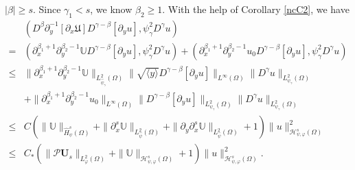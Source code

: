 \documentclass{amsart}
\numberwithin{equation}{section}
\newcommand\y{{{\langle y \rangle}}}
\begin{document}
 $|\beta|\geq s$. Since $\gamma_{1}<s$, we know $\beta_{2}\geq1$. With the help of Corollary \ref{ncC2}, we have
\begin{align*}
&(D^{\beta}\partial_{y}^{-1}[\partial_{x}\mathfrak{U}]D^{\gamma-\beta}[\partial_{y}u],\psi_{\gamma}^{2}D^{\gamma}u)\\
=& (\partial_{x}^{\beta_{1}+1}\partial_{y}^{\beta_{2}-1}\mathbb{U}D^{\gamma-\beta}[\partial_{y}u],\psi_{\gamma}^{2}D^{\gamma}u)
  +(\partial_{x}^{\beta_{1}+1}\partial_{y}^{\beta_{2}-1}u_{0}D^{\gamma-\beta}[\partial_{y}u],\psi_{\gamma}^{2}D^{\gamma}u)\\
\leq& \|\partial_{x}^{\beta_{1}+1}\partial_{y}^{\beta_{2}-1}\mathbb{U}\|_{L_{\hat{\psi}_{\gamma}}^{2}(\Omega)}
      \|\sqrt{\y}D^{\gamma-\beta}[\partial_{y}u]\|_{L^{\infty}(\Omega)}
      \|D^{\gamma}u\|_{L_{\psi_{\gamma}}^{2}(\Omega)}\\
    &+\|\partial_{x}^{\beta_{1}+1}\partial_{y}^{\beta_{2}-1}u_{0}\|_{L^{\infty}(\Omega)}
      \|D^{\gamma-\beta}[\partial_{y}u]\|_{L_{\psi_{\gamma}}^{2}(\Omega)}
      \|D^{\gamma}u\|_{L_{\psi_{\gamma}}^{2}(\Omega)}\\
\leq& C\left(\|\mathbb{U}\|_{\hat{H}_{\psi}^{s}(\Omega)}
        +\|\partial_{x}^{s}\mathbb{U}\|_{L_{\hat{\psi}}^{2}(\Omega)}
        +\|\partial_{y}\partial_{x}^{s}\mathbb{U}\|_{L_{\hat{\psi}}^{2}(\Omega)}+1\right)
       \|u\|_{\mathcal{H}_{\psi,\varphi}^{s}(\Omega)}^{2}\\
\leq& C_{*}\left(\|\mathcal{P}\mathbf{U}_{s}\|_{L_{\varphi}^{2}(\Omega)}+\|\mathbb{U}\|_{\mathcal{H}_{\psi,\varphi}^{s}(\Omega)}+1\right)
       \|u\|_{\mathcal{H}_{\psi,\varphi}^{s}(\Omega)}^{2}.
\end{align*}
\end{document}

